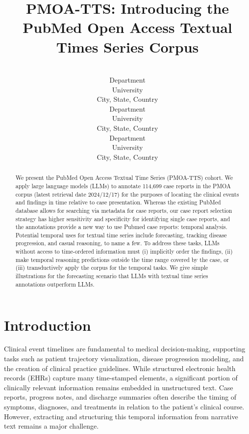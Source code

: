 \documentclass[pmlr]{jmlr}%
\title[PMOA-TTS: PubMed Open Access Textual Times Series Corpus]{PMOA-TTS: Introducing the PubMed Open Access Textual Times Series Corpus}
\author{\Name{Firstname Lastname$^*$}
       \Email{name@email.edu}\\ 
       \addr Department\\
       University\\
       City, State, Country 
       \AND
       \Name{Firstname Lastname$^*$}
       \Email{name@email.edu}\\ 
       \addr Department\\
       University\\
       City, State, Country 
       \AND 
       \Name{Firstname Lastname}
       \Email{name@email.edu}\\ 
       \addr Department\\
       University\\
       City, State, Country}
\begin{document}
\maketitle

\def\thefootnote{*}\def\thefootnote{\arabic{footnote}}

\begin{abstract}
We present the PubMed Open Access Textual Time Series (PMOA-TTS) cohort.
We apply large language models (LLMs) to annotate 114,699 case reports in the PMOA corpus (latest retrieval date 2024/12/17) for the purposes of locating the clinical events and findings in time relative to case presentation. Whereas the existing PubMed database allows for searching via metadata for case reports, our case report selection strategy has higher sensitivity and specificity for identifying single case reports, and the annotations provide a new way to use Pubmed case reports: temporal analysis. Potential temporal uses for textual time series include forecasting, tracking disease progression, and casual reasoning, to name a few. To address these tasks, LLMs without access to time-ordered information must (i) implicitly order the findings, (ii) make temporal reasoning predictions outside the time range covered by the case, or (iii) transductively apply the corpus for the temporal tasks. We give simple illustrations for the forecasting scenario that LLMs with textual time series annotations outperform LLMs.
\end{abstract}

\section{Introduction}

Clinical event timelines are fundamental to medical decision-making, supporting tasks such as patient trajectory visualization, disease progression modeling, and the creation of clinical practice guidelines. While structured electronic health records (EHRs) capture many time-stamped elements, a significant portion of clinically relevant information remains embedded in unstructured text. Case reports, progress notes, and discharge summaries often describe the timing of symptoms, diagnoses, and treatments in relation to the patient’s clinical course. However, extracting and structuring this temporal information from narrative text remains a major challenge.
\end{document}
